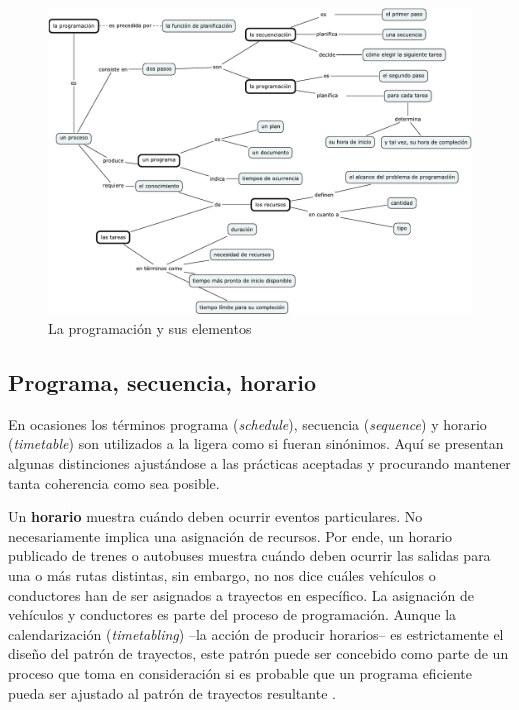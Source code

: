 \documentclass[spanish,draft,12pt,headsepline,footsepline,paper=letter]{scrreprt}
\begin{document}
\begin{figure}
\includegraphics[width=\textheight]{scheduling.pdf}
\caption[La programación y sus elementos]{La programación y sus elementos}
\label{fig:programacion}
\end{figure}

\subsection{Programa, secuencia, horario}
\label{programa_secuencia_horario}

En ocasiones los términos programa (\textit{schedule}), secuencia (\textit{sequence}) y horario (\textit{timetable}) son utilizados a la ligera como si fueran sinónimos. Aquí se presentan algunas distinciones ajustándose a las prácticas aceptadas y procurando mantener tanta coherencia como sea posible.

Un \textbf{horario} muestra cuándo deben ocurrir eventos particulares. No necesariamente implica una asignación de recursos. Por ende, un horario publicado de trenes o autobuses muestra cuándo deben ocurrir las salidas para una o más rutas distintas, sin embargo, no nos dice cuáles vehículos o conductores han de ser asignados a trayectos en específico.
%
La asignación de vehículos y conductores es parte del proceso de programación. Aunque la calendarización (\textit{timetabling}) –la acción de producir horarios– es estrictamente el diseño del patrón de trayectos, este patrón puede ser concebido como parte de un proceso que toma en consideración si es probable que un programa eficiente pueda ser ajustado al patrón de trayectos resultante \cite[p.~48]{wren95scheduling-timetabling}.
\end{document}
